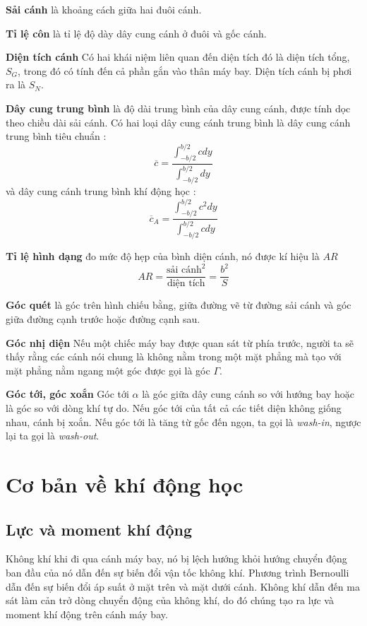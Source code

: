 \documentclass[KHI_DONG_HOC.tex]{subfiles}
\begin{document}
\textbf{Sải cánh} là khoảng cách giữa hai đuôi cánh.

\textbf{Tỉ lệ côn} là tỉ lệ độ dày dây cung cánh ở đuôi và gốc cánh.

\textbf{Diện tích cánh} Có hai khái niệm liên quan đến diện tích đó là diện tích tổng, $S_G$, trong đó có tính đến cả phần gắn vào thân máy bay. Diện tích cánh bị phơi ra là $S_N$.

\textbf{Dây cung trung bình} là độ dài trung bình của dây cung cánh, được tính dọc theo chiều dài sải cánh. Có hai loại dây cung cánh trung bình là dây cung cánh trung bình tiêu chuẩn :
\[\overline c  = \frac{{\int_{ - b/2}^{b/2} {cdy} }}{{\int_{ - b/2}^{b/2} {dy} }}\]
và dây cung cánh trung bình khí động học :
\[{\overline c _A} = \frac{{\int_{ - b/2}^{b/2} {{c^2}dy} }}{{\int_{ - b/2}^{b/2} {cdy} }}\]


\textbf{Tỉ lệ hình dạng} đo mức độ hẹp của bình diện cánh, nó được kí hiệu là $AR$
$$
	AR = \frac{\text{sải cánh}^2}{\text{diện tích}} = \frac{b^2}{S}
$$

\textbf{Góc quét} là góc trên hình chiếu bằng, giữa đường vẽ từ đường sải cánh và góc giữa đường cạnh trước hoặc đường cạnh sau.

\textbf{Góc nhị diện} Nếu một chiếc máy bay được quan sát từ phía trước, người ta sẽ thấy rằng các cánh nói chung là không nằm trong một mặt phẳng mà tạo với mặt phẳng nằm ngang một góc được gọi là góc $\Gamma$.

\textbf{Góc tới, góc xoắn} Góc tới $\alpha$ là góc giữa dây cung cánh so với hướng bay hoặc là góc so với dòng khí tự do. Nếu góc tới của tất cả các tiết diện không giống nhau, cánh bị xoắn. Nếu góc tới là tăng từ gốc đến ngọn, ta gọi là \emph{wash-in}, ngược lại ta gọi là \emph{wash-out}.

\section{Cơ bản về khí động học}
\subsection{Lực và moment khí động}
Không khí khi đi qua cánh máy bay, nó bị lệch hướng khỏi hướng chuyển động ban đầu của nó dẫn đến sự biến đổi vận tốc không khí. Phương trình Bernoulli dẫn đến sự biến đổi áp suất ở mặt trên và mặt dưới cánh. Không khí dẫn đến ma sát làm cản trở dòng chuyển động của không khí, do đó chúng tạo ra lực và moment khí động trên cánh máy bay.
\end{document}
